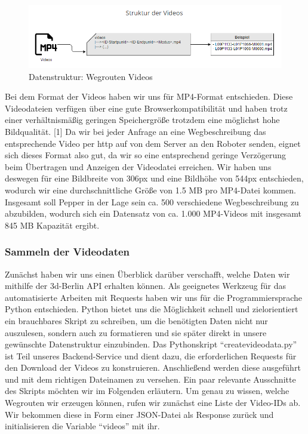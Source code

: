 \begin{figure}[H]
    \includegraphics[width=\textwidth]{Figures/3DNavigator/Videostruktur_Raumfinder.png}
    \caption{Datenstruktur: Wegrouten Videos}
    \label{fig:integration}
    \centering
\end{figure}\vspace{-2.5mm}

Bei dem Format der Videos haben wir uns für MP4-Format entschieden. Diese Videodateien verfügen über eine gute Browserkompatibilität und haben trotz einer verhältnismäßig geringen Speichergröße trotzdem eine möglichst hohe Bildqualität. [1] Da wir bei jeder Anfrage an eine Wegbeschreibung das entsprechende Video per http auf von dem Server an den Roboter senden, eignet sich dieses Format also gut, da wir so eine entsprechend geringe Verzögerung beim Übertragen und Anzeigen der Videodatei erreichen. Wir haben uns deswegen für eine Bildbreite von 306px und eine Bildhöhe von 544px entschieden, wodurch wir eine durchschnittliche Größe von 1.5 MB pro MP4-Datei kommen. Insgesamt soll Pepper in der Lage sein ca. 500 verschiedene Wegbeschreibung zu abzubilden, wodurch sich ein Datensatz von ca. 1.000 MP4-Videos mit insgesamt 845 MB Kapazität ergibt.

\subsubsection{Sammeln der Videodaten}

Zunächst haben wir uns einen Überblick darüber verschafft, welche Daten wir mithilfe der 3d-Berlin API erhalten können. Als geeignetes Werkzeug für das automatisierte Arbeiten mit Requests haben wir uns für die Programmiersprache Python entschieden. Python bietet uns die Möglichkeit schnell und zielorientiert ein brauchbares Skript zu schreiben, um die benötigten Daten nicht nur auszulesen, sondern auch zu formatieren und sie später direkt in unsere gewünschte Datenstruktur einzubinden. Das Pythonskript “createvideodata.py” ist Teil unseres Backend-Service und dient dazu, die erforderlichen Requests für den Download der Videos zu konstruieren. Anschließend werden diese ausgeführt und mit dem richtigen Dateinamen zu versehen. Ein paar relevante Ausschnitte des Skripts möchten wir im Folgenden erläutern.
Um genau zu wissen, welche Wegrouten wir erzeugen können, rufen wir zunächst eine Liste der Video-IDs ab. Wir bekommen diese in Form einer JSON-Datei als Response zurück und initialisieren die Variable “videos” mit ihr.

